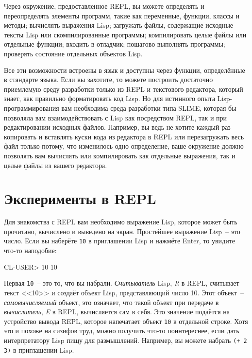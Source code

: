 Через окружение, предоставленное REPL, вы можете определять и переопределять элементы
программ, такие как переменные, функции, классы и методы; вычислять выражения Lisp;
загружать файлы, содержащие исходные тексты Lisp или скомпилированные программы;
компилировать целые файлы или отдельные функции; входить в отладчик; пошагово выполнять
программы; проверять состояние отдельных объектов Lisp.

Все эти возможности встроены в язык и доступны через функции, определённые в стандарте
языка. Если вы захотите, то можете построить достаточно приемлемую среду разработки только
из REPL и текстового редактора, который знает, как правильно форматировать код Lisp. Но для
истинного опыта Lisp-программирования вам необходима среда разработки типа SLIME, которая
бы позволяла вам взаимодействовать с Lisp как посредством REPL, так и при редактировании
исходных файлов. Например, вы ведь не хотите каждый раз копировать и вставлять куски
кода из редактора в REPL или перезагружать весь файл только потому, что изменилось одно
определение, ваше окружение должно позволять вам вычислять или компилировать как отдельные
выражения, так и целые файлы из вашего редактора.

\section{Эксперименты в REPL}

Для знакомства с REPL вам необходимо выражение Lisp, которое может быть прочитано,
вычислено и выведено на экран. Простейшее выражение Lisp~-- это число. Если вы наберёте
\lstinline{10} в приглашении Lisp и нажмёте Enter, то увидите что-то наподобие:

\begin{myverb}
CL-USER> 10
10
\end{myverb}

Первая \lstinline{10}~-- это то, что вы набрали. \emph{Считыватель} Lisp, \emph{R} в REPL,
считывает текст <<10>> и создаёт объект Lisp, представляющий число 10. Этот объект~--
\emph{самовычисляемый} объект, это означает, что такой объект при передаче в \emph{вычислитель},
\emph{E} в REPL, вычисляется сам в себя. Это значение подаётся на устройство вывода REPL,
которое напечатает объект \lstinline{10} в отдельной строке. Хотя это и похоже на сизифов труд, можно
получить что-то поинтереснее, если дать интерпретатору Lisp пищу для размышлений.
Например, вы можете набрать \lstinline{(+ 2 3)} в приглашении Lisp.

